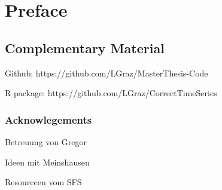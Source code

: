 \chapter*{Preface}

\section*{Complementary Material}


Github: https://github.com/LGraz/MasterThesis-Code

R package: https://github.com/LGraz/CorrectTimeSeries 


\subsection*{Acknowlegements}
Betreuung von Gregor

Ideen mit Meinshausen

Resourccen vom SFS

